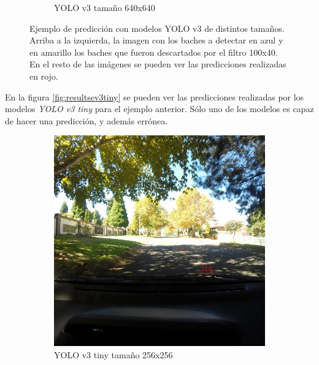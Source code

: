 \begin{figure}[H]
\begin{subfigure}[h]{0.45\linewidth}
		\caption{YOLO v3 tamaño 640x640}
	\end{subfigure}
	\caption{Ejemplo de predicción con modelos YOLO v3 de distintos tamaños. Arriba a la izquierda, la imagen con los baches a detectar en azul y en amarillo los baches que fueron descartados por el filtro 100x40. En el resto de las imágenes se pueden ver las predicciones realizadas en rojo.}
	\label{fig:resultsev3}
\end{figure}

En la figura \ref{fig:resultsev3tiny} se pueden ver las predicciones realizadas por los modelos \textit{YOLO v3 tiny} para el ejemplo anterior. Sólo uno de los modelos es capaz de hacer una predicción, y además errónea.

\begin{figure}[H]
	\centering
	\begin{subfigure}[h]{0.45\linewidth}
		\includegraphics[width=\linewidth]{images/results_e_yolo_v3_tiny_256.jpg}
		\caption{YOLO v3 tiny tamaño 256x256}
	\end{subfigure}
	\begin{subfigure}[h]{0.45\linewidth}

\end{subfigure}
\end{figure}

